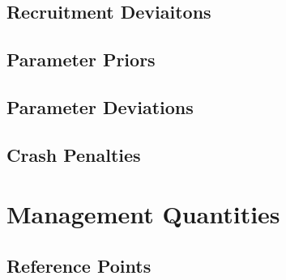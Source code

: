 \documentclass[11pt,
  english,
  letterpaper,
]{article}
\begin{document}
\leavevmode\tagmcend\tagstructend


\hypertarget{recruitment-deviaitons}{%
\subsection{Recruitment Deviaitons}\label{recruitment-deviaitons}}

\leavevmode\tagmcend\tagstructend


\hypertarget{parameter-priors}{%
\subsection{Parameter Priors}\label{parameter-priors}}

\leavevmode\tagmcend\tagstructend


\hypertarget{parameter-deviations}{%
\subsection{Parameter Deviations}\label{parameter-deviations}}

\leavevmode\tagmcend\tagstructend


\hypertarget{crash-penalties}{%
\subsection{Crash Penalties}\label{crash-penalties}}

\leavevmode\tagmcend\tagstructend


\hypertarget{management-quantities}{%
\section{Management Quantities}\label{management-quantities}}

\leavevmode\tagmcend\tagstructend


\hypertarget{reference-points}{%
\subsection{Reference Points}\label{reference-points}}
\end{document}
